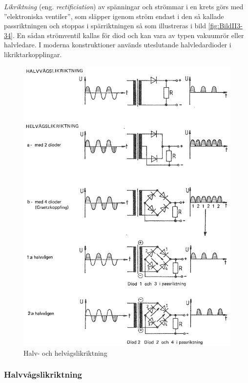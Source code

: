 \emph{Likriktning} (eng. \emph{rectificiation}) av spänningar och strömmar i en
krets görs med ''elektroniska ventiler'', som släpper igenom ström endast i den
så kallade passriktningen och stoppas i spärriktningen så som illustreras i
bild \ref{fig:BildII3-34}.
En sådan strömventil kallas för diod och kan vara av typen vakuumrör eller
halvledare.
I moderna konstruktioner används uteslutande halvledardioder i
likriktarkopplingar.

\begin{figure}
\includegraphics[width=\textwidth]{images/cropped_pdfs/bild_2_3-35.pdf}
\caption{Halv- och helvågslikriktning}
\label{fig:BildII3-35}
\end{figure}

\subsubsection{Halvvågslikriktning}

